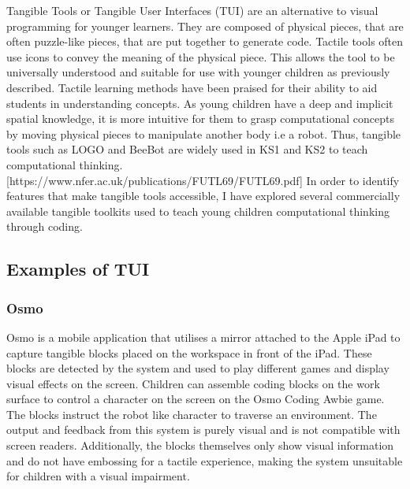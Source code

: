 \documentclass[oneside,%
                    author={Malak Hajji},
                    degree={BSc},
                    title={Designing An Accessible Computational Toolkit For Students},
                  subtitle={With Mixed Visual Abilities}]{dissertation}
\begin{document}
Tangible Tools or Tangible User Interfaces (TUI) are an alternative to visual programming for younger learners. They are composed of physical pieces, that are often puzzle-like pieces, that are put together to generate code. Tactile tools often use icons to convey the meaning of the physical piece. This allows the tool to be universally understood and suitable for use with younger children as previously described. Tactile learning methods have been praised for their ability to aid students in understanding concepts. As young children have a deep and implicit spatial knowledge, it is more intuitive for them to grasp computational concepts by moving physical pieces to manipulate another body i.e a robot. Thus, tangible tools such as LOGO and BeeBot are widely used in KS1 and KS2 to teach computational thinking. [https://www.nfer.ac.uk/publications/FUTL69/FUTL69.pdf]
In order to identify features that make tangible tools accessible, I have explored several commercially available tangible toolkits used to teach young children computational thinking through coding.

\subsection{Examples of TUI}
\subsubsection{Osmo}
Osmo is a mobile application that utilises a mirror attached to the Apple iPad to capture tangible blocks placed on the workspace in front of the iPad. These blocks are detected by the system and used to play different games and display visual effects on the screen. Children can assemble coding blocks on the work surface to control a character on the screen on the Osmo Coding Awbie game. The blocks instruct the robot like character to traverse an environment. The output and feedback from this system is purely visual and is not compatible with screen readers. Additionally, the blocks themselves only show visual information and do not have embossing for a tactile experience, making the system unsuitable for children with a visual impairment.  
\end{document}

